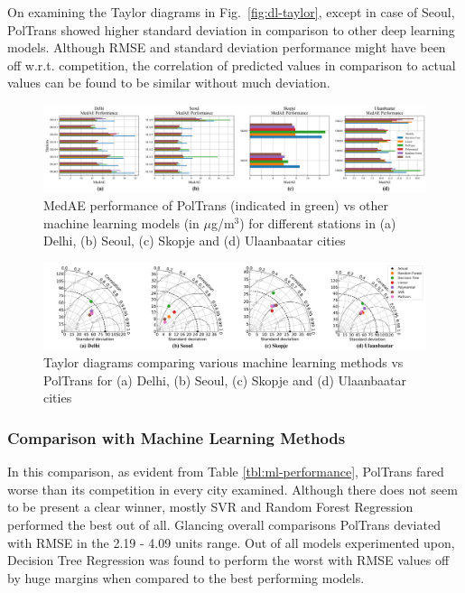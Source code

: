 \documentclass[10pt,journal]{IEEEtran}
\begin{document}
On examining the Taylor diagrams in Fig.~\ref{fig:dl-taylor}, except in case of Seoul, {PolTrans} showed higher standard deviation in comparison to other deep learning models. Although RMSE and standard deviation performance might have been off w.r.t. competition, the correlation of predicted values in comparison to actual values can be found to be similar without much deviation.

\begin{figure}[h]
\centering
\includegraphics[scale=0.365]{../paper_figures/ml_medae.png}
\caption{MedAE performance of {PolTrans} (indicated in green) vs other machine learning models (in $\mu$g/m$^{3}$) for different stations in (a) Delhi, (b) Seoul, (c) Skopje and (d) Ulaanbaatar cities}
\label{fig:ml-medae}
\end{figure}

\begin{figure}[h]
\centering
\includegraphics[width=18cm]{../paper_figures/merged_taylor_ml.png}
\caption{Taylor diagrams comparing various machine learning methods vs {PolTrans} for (a) Delhi, (b) Seoul, (c) Skopje and (d) Ulaanbaatar cities}
\label{fig:ml-taylor}
\end{figure}

\subsubsection{Comparison with Machine Learning Methods}
\label{sec:ml-comp}

In this comparison, as evident from Table \ref{tbl:ml-performance}, {PolTrans} fared worse than its competition in every city examined. Although there does not seem to be present a clear winner, mostly SVR and Random Forest Regression performed the best out of all. Glancing overall comparisons {PolTrans} deviated with RMSE in the 2.19 - 4.09 units range. Out of all models experimented upon, Decision Tree Regression was found to perform the worst with RMSE values off by huge margins when compared to the best performing models.
\end{document}
